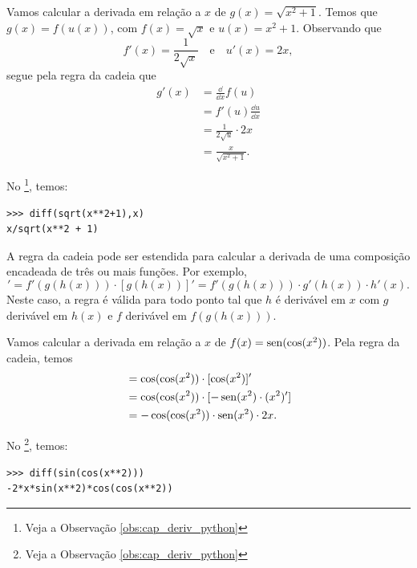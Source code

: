 \begin{ex}
  Vamos calcular a derivada em relação a $x$ de $g(x) = \sqrt{x^2+1}$. Temos que $g(x) = f(u(x))$, com $f(x) = \sqrt{x}$ e $u(x) = x^2+1$. Observando que
  \begin{equation}
    f'(x) = \frac{1}{2\sqrt{x}}\quad\text{e}\quad u'(x)=2x,
  \end{equation}
  segue pela regra da cadeia que
  \begin{align}
    g'(x) &= \frac{\dd}{\dd x}f(u) \\
          &= f'(u)\frac{\dd u}{\dd x} \\
          &= \frac{1}{2\sqrt{u}}\cdot 2x \\
          &= \frac{x}{\sqrt{x^2+1}}.
  \end{align}

  \ifispython
  No \sympy\footnote{Veja a Observação \ref{obs:cap_deriv_python}}, temos:
\begin{verbatim}
>>> diff(sqrt(x**2+1),x)
x/sqrt(x**2 + 1)
\end{verbatim}
  \fi  
\end{ex}

A regra da cadeia pode ser estendida para calcular a derivada de uma composição encadeada de três ou mais funções. Por exemplo,
\begin{equation}
  [f(g(h(x)))]' = f'(g(h(x)))\cdot[g(h(x))]' = f'(g(h(x)))\cdot g'(h(x))\cdot h'(x).
\end{equation}
Neste caso, a regra é válida para todo ponto tal que $h$ é derivável em $x$ com $g$ derivável em $h(x)$ e $f$ derivável em $f(g(h(x)))$.

\begin{ex}
  Vamos calcular a derivada em relação a $x$ de $f(x) = \operatorname{sen}(\cos(x^2))$. Pela regra da cadeia, temos
  \begin{align}
    [\sen(\cos(x^2))] &= \cos(\cos(x^2))\cdot[\cos(x^2)]' \\
                    &= \cos(\cos(x^2))\cdot [-\sen(x^2)\cdot (x^2)'] \\
                    &= -\cos(\cos(x^2))\cdot\sen(x^2)\cdot 2x.
  \end{align}

  \ifispython
  No \sympy\footnote{Veja a Observação \ref{obs:cap_deriv_python}}, temos:
\begin{verbatim}
>>> diff(sin(cos(x**2)))
-2*x*sin(x**2)*cos(cos(x**2))
\end{verbatim}
  \fi  
\end{ex}

